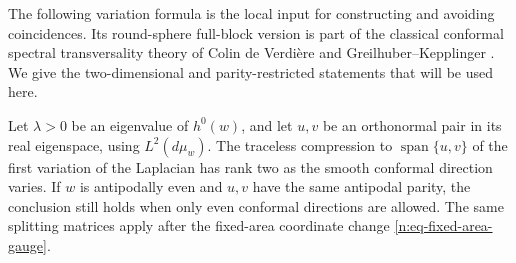 The following variation formula is the local input for constructing and
avoiding coincidences.  Its round-sphere full-block version is part of the
classical conformal spectral transversality theory of Colin de Verdi\`ere
and Greilhuber--Kepplinger
\cite{ColinDeVerdiere,GreilhuberKepplinger}.  We give the two-dimensional
and parity-restricted statements that will be used here.

\begin{lemma}\label{n:lem-two-directions}
Let \(\lambda>0\) be an eigenvalue of \(h^0(w)\), and let \(u,v\) be an
orthonormal pair in its real eigenspace, using \(L^2(d\mu_w)\).
The traceless compression to \(\operatorname{span}\{u,v\}\) of the
first variation of the Laplacian has rank two as the smooth conformal
direction varies.  If \(w\) is antipodally even and \(u,v\)
have the same antipodal parity, the conclusion still holds when only
even conformal directions are allowed.  The same splitting matrices apply
after the fixed-area coordinate change \eqref{n:eq-fixed-area-gauge}.
\end{lemma}

